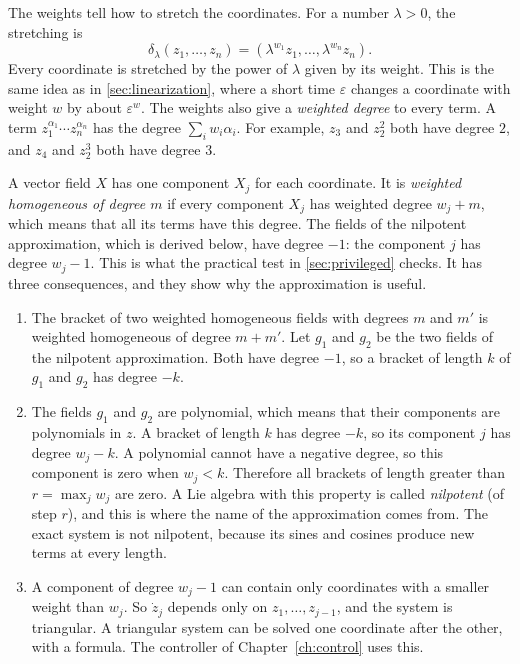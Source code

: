 The weights tell how to stretch the coordinates. For a number $\lambda>0$, the
stretching is
\begin{equation}
  \delta_\lambda(z_1,\dots,z_n)=(\lambda^{w_1}z_1,\dots,\lambda^{w_n}z_n).
\end{equation}
Every coordinate is stretched by the power of $\lambda$ given by its weight. This
is the same idea as in \cref{sec:linearization}, where a short time $\varepsilon$
changes a coordinate with weight $w$ by about $\varepsilon^{w}$. The weights also
give a \emph{weighted degree} to every term. A term
$z_1^{\alpha_1}\cdots z_n^{\alpha_n}$ has the degree $\sum_iw_i\alpha_i$. For
example, $z_3$ and $z_2^2$ both have degree $2$, and $z_4$ and $z_2^3$ both have
degree $3$.

A vector field $X$ has one component $X_j$ for each coordinate. It is
\emph{weighted homogeneous of degree $m$} if every component $X_j$ has weighted
degree $w_j+m$, which means that all its terms have this degree. The fields of
the nilpotent approximation, which is derived below, have degree $-1$: the
component $j$ has degree $w_j-1$. This is what the practical test in
\cref{sec:privileged} checks. It has three consequences, and they show why the
approximation is useful.

\begin{enumerate}
  \item The bracket of two weighted homogeneous fields with degrees $m$ and $m'$
        is weighted homogeneous of degree $m+m'$. Let $g_1$ and $g_2$ be the two
        fields of the nilpotent approximation. Both have degree $-1$, so a
        bracket of length $k$ of $g_1$ and $g_2$ has degree $-k$.
  \item The fields $g_1$ and $g_2$ are polynomial, which means that their
        components are polynomials in $z$. A bracket of length $k$ has degree
        $-k$, so its component $j$ has degree $w_j-k$. A polynomial cannot have
        a negative degree, so this component is zero when $w_j<k$. Therefore all
        brackets of length greater than $r=\max_jw_j$ are zero. A Lie algebra
        with this property is called \emph{nilpotent} (of step $r$), and this is
        where the name of the approximation comes from. The exact system is not
        nilpotent, because its sines and cosines produce new terms at every
        length.
  \item A component of degree $w_j-1$ can contain only coordinates with a smaller
        weight than $w_j$. So $\dot z_j$ depends only on $z_1,\dots,z_{j-1}$, and
        the system is triangular. A triangular system can be solved one
        coordinate after the other, with a formula. The controller of
        Chapter~\ref{ch:control} uses this.
\end{enumerate}

